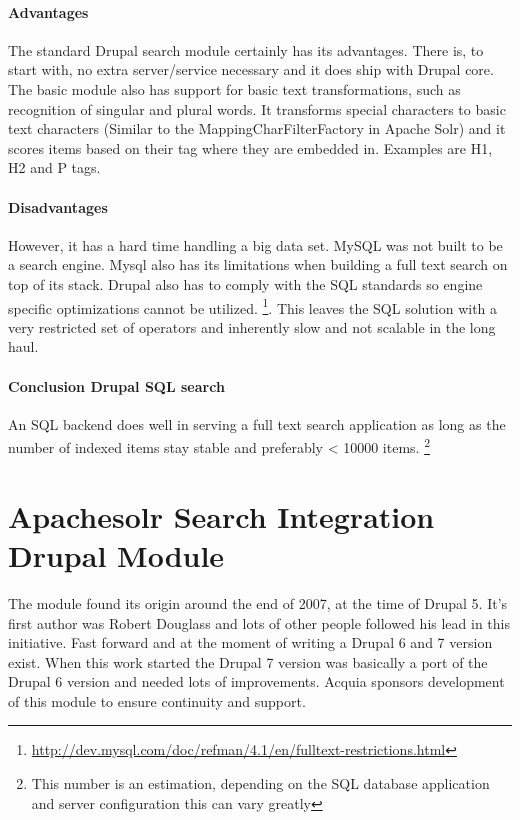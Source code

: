 \paragraph{Advantages} The standard Drupal search module certainly has its advantages. There is, to start with, no extra server/service necessary and it does ship with Drupal core. The basic module also has support for basic text transformations, such as recognition of singular and plural words. It transforms special characters to basic text characters (Similar to the MappingCharFilterFactory in Apache Solr) and it scores items based on their tag where they are embedded in. Examples are H1, H2 and P tags.

\paragraph{Disadvantages} However, it has a hard time handling a big data set. MySQL was not built to be a search engine. Mysql also has its limitations when building a full text search on top of its stack. Drupal also has to comply with the SQL standards so engine specific optimizations cannot be utilized. \footnote{\url{http://dev.mysql.com/doc/refman/4.1/en/fulltext-restrictions.html}}. This leaves the SQL solution with a very restricted set of operators and inherently slow and not scalable in the long haul. 

\paragraph{Conclusion Drupal SQL search} An SQL backend does well in serving a full text search application as long as the number of indexed items stay stable and preferably < 10000 items. \footnote{This number is an estimation, depending on the SQL database application and server configuration this can vary greatly}

\section{Apachesolr Search Integration Drupal Module}
The module found its origin around the end of 2007, at the time of Drupal 5. It's first author was Robert Douglass and lots of other people followed his lead in this initiative. Fast forward and at the moment of writing a Drupal 6 and 7 version exist. When this work started the Drupal 7 version was basically a port of the Drupal 6 version and needed lots of improvements. Acquia sponsors development of this module to ensure continuity and support.

